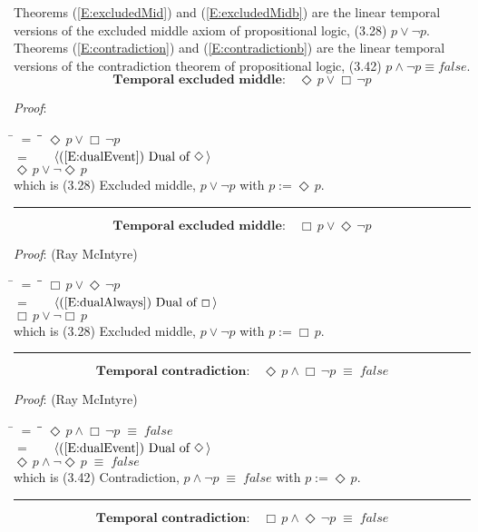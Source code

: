 \documentclass[12pt, fleqn, leqno]{article}
\newcommand{\lgap}{2pt}                             %
\newcommand{\mymathindent}{24pt}                    %
\newcommand{\equivs}{\ensuremath{\;\equiv\;}}       %
\newcommand{\Event}{\Diamond\,}
\newcommand{\Always}{\Box\,}
\newcommand{\myqed}{\rule[-.23ex]{1.2ex}{2.0ex}}
\newcommand{\myqedtab}{\hspace{384pt}}              %
\newcommand{\Gll} {\langle}                         %
\newcommand{\Ggg} {\rangle}                         %
\newcommand{\Hint}[1]     {\ \ \ $\Gll              \mbox{#1} \Ggg$ }   %
\begin{document}
Theorems (\ref{E:excludedMid}) and (\ref{E:excludedMidb}) are the linear temporal versions of the excluded middle axiom of propositional logic, (3.28) $p\lor\neg p$.
Theorems (\ref{E:contradiction}) and (\ref{E:contradictionb}) are the linear temporal versions of the contradiction theorem of propositional logic, (3.42) $p\land\neg p\equiv false$.
\begin{equation}\label{E:excludedMid}
\textbf{Temporal excluded middle:}\quad \Event p \lor \Always\neg p
\end{equation}

\emph{Proof}:
\begin{tabbing}
\hspace{\mymathindent} \= $= \;$ \= \myqedtab \= \kill
  \> \>   $\Event p \lor \Always\neg p$\\[\lgap]
  \> $=$  \>  \Hint{(\ref{E:dualEvent}) Dual of $\Event$}\\[\lgap]
  \> \>   $\Event p \lor \neg\Event p$\\[\lgap]
  \> which is (3.28) Excluded middle, $p\lor\neg p$ with $p := \Event p$. \quad \myqed
\end{tabbing}
\begin{equation}\label{E:excludedMidb}
\textbf{Temporal excluded middle:}\quad \Always p \lor \Event\neg p
\end{equation}

\emph{Proof}: (Ray McIntyre)
\begin{tabbing}
\hspace{\mymathindent} \= $= \;$ \= \myqedtab \= \kill
  \> \>   $\Always p \lor \Event\neg p$\\[\lgap]
  \> $=$  \>  \Hint{(\ref{E:dualAlways}) Dual of $\Always$}\\[\lgap]
  \> \>   $\Always p \lor \neg\Always p$\\[\lgap]
  \> which is (3.28) Excluded middle, $p\lor\neg p$ with $p := \Always p$. \quad \myqed
\end{tabbing}
\begin{equation}\label{E:contradiction}
\textbf{Temporal contradiction:}\quad \Event p \land \Always\neg p \equivs false
\end{equation}

\emph{Proof}: (Ray McIntyre)
\begin{tabbing}
\hspace{\mymathindent} \= $= \;$ \= \myqedtab \= \kill
  \> \>   $\Event p \land \Always\neg p \equivs false$\\[\lgap]
  \> $=$  \>  \Hint{(\ref{E:dualEvent}) Dual of $\Event$}\\[\lgap]
  \> \>   $\Event p \land \neg\Event p \equivs false$\\[\lgap]
  \> which is (3.42) Contradiction, $p\land\neg p \equivs false$ with $p := \Event p$. \quad \myqed
\end{tabbing}
\begin{equation}\label{E:contradictionb}
\textbf{Temporal contradiction:}\quad \Always p \land \Event\neg p \equivs false
\end{equation}
\end{document}

